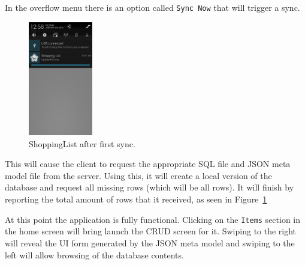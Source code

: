 In the overflow menu there is an option called \texttt{Sync Now} that will trigger a sync.


\begin{figure}[h!]
\centering
\includegraphics[width=0.25\textwidth]{images/dl.png}
\caption{ShoppingList after first sync.}
\label{fig:first_sync}
\end{figure}

This will cause the client to request the appropriate SQL file and JSON meta
model file from the server. Using this, it will create a local version of the
database and request all missing rows (which will be all rows). It will finish
by reporting the total amount of rows that it received, as seen in
Figure~\ref{fig:first_sync}




At this point the application is fully functional. Clicking on the
\texttt{Items} section in the home screen will bring launch the CRUD screen for
it. Swiping to the right will reveal the UI form generated by the JSON meta
model and swiping to the left will allow browsing of the database contents. 




